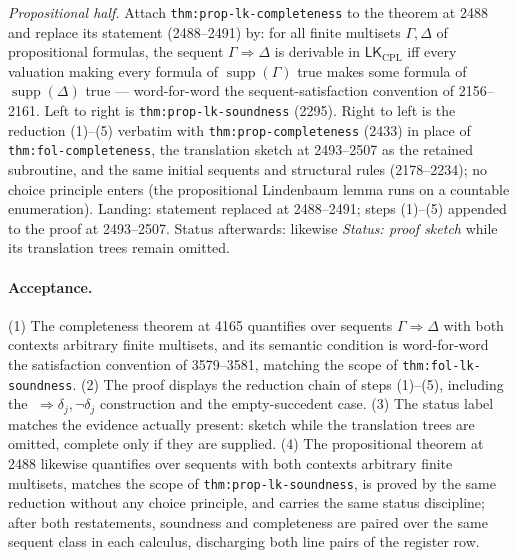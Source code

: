 \emph{Propositional half.}  Attach \texttt{thm:prop-lk-completeness} to the
theorem at 2488 and replace its statement (2488--2491) by: for all finite
multisets \(\Gamma,\Delta\) of propositional formulas, the sequent
\(\Gamma\Rightarrow\Delta\) is derivable in \(\mathsf{LK}_{\mathrm{CPL}}\)
iff every valuation making every formula of \(\operatorname{supp}(\Gamma)\)
true makes some formula of \(\operatorname{supp}(\Delta)\) true ---
word-for-word the sequent-satisfaction convention of 2156--2161.  Left to
right is \texttt{thm:prop-lk-soundness} (2295).  Right to left is the
reduction (1)--(5) verbatim with \texttt{thm:prop-completeness} (2433) in
place of \texttt{thm:fol-completeness}, the translation sketch at 2493--2507
as the retained subroutine, and the same initial sequents and structural
rules (2178--2234); no choice principle enters (the propositional Lindenbaum
lemma runs on a countable enumeration).  Landing: statement replaced at
2488--2491; steps (1)--(5) appended to the proof at 2493--2507.  Status
afterwards: likewise \textit{Status: proof sketch} while its translation
trees remain omitted.

\paragraph{Acceptance.}
(1) The completeness theorem at 4165 quantifies over sequents
\(\Gamma\Rightarrow\Delta\) with both contexts arbitrary finite multisets, and
its semantic condition is word-for-word the satisfaction convention of
3579--3581, matching the scope of \texttt{thm:fol-lk-soundness}.  (2) The proof
displays the reduction chain of steps (1)--(5), including the
\(\;\Rightarrow\delta_j,\neg\delta_j\) construction and the empty-succedent
case.  (3) The status label matches the evidence actually present: sketch
while the translation trees are omitted, complete only if they are supplied.
(4) The propositional theorem at 2488 likewise quantifies over sequents with
both contexts arbitrary finite multisets, matches the scope of
\texttt{thm:prop-lk-soundness}, is proved by the same reduction without any
choice principle, and carries the same status discipline; after both
restatements, soundness and completeness are paired over the same sequent
class in each calculus, discharging both line pairs of the register row.
\endgroup
